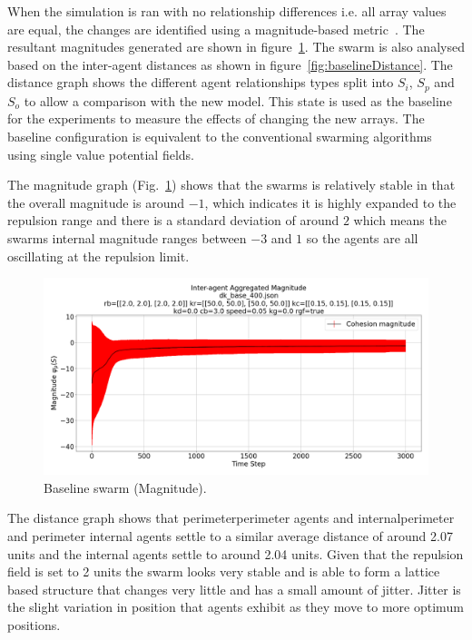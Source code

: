 \documentclass[12pt,a4paper]{IEEEtran}
\begin{document}
When the simulation is ran with no relationship differences i.e. all array values are equal, the changes are identified using a magnitude-based metric~\cite{eliot2018metric}. The resultant magnitudes generated are shown in figure~\ref{fig:baselineMagnitude}. The swarm is also analysed based on the inter-agent distances as shown in figure~\ref{fig:baselineDistance}. The distance graph shows the different agent relationships types split into $S_{i}$, $S_{p}$ and $S_{o}$ to allow a comparison with the new model. This state is used as the baseline for the experiments to measure the effects of changing the new arrays. The baseline configuration is equivalent to the conventional swarming algorithms using single value potential fields.

The magnitude graph (Fig.~\ref{fig:baselineMagnitude}) shows that the swarms is relatively stable in that the overall magnitude is around $-1$, which indicates it is highly expanded to the repulsion range and there is a standard deviation of around $2$ which means the swarms internal magnitude ranges between $-3$ and $1$ so the agents are all oscillating at the repulsion limit.

\begin{figure}[H]
	\begin{center}
		\includegraphics[width=1.0\linewidth]{figures/baselineMagnitude}
	\end{center}
	\caption{Baseline swarm (Magnitude). \label{fig:baselineMagnitude}}
\end{figure}

The distance graph shows that perimeter\textrightarrow perimeter agents and internal\textrightarrow perimeter and perimeter \textrightarrow internal agents settle to a similar average distance of around 2.07 units and the internal agents settle to around 2.04 units. Given that the repulsion field is set to 2 units the swarm looks very stable and is able to form a lattice based structure that changes very little and has a small amount of jitter. Jitter is the slight variation in position that agents exhibit as they move to more optimum positions.
\end{document}
